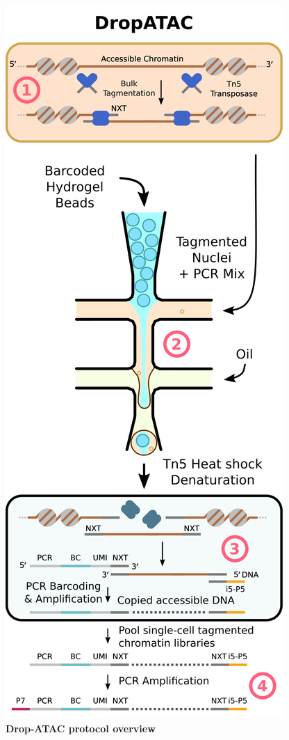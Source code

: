 
\clearpage
\begin{figure}
\centering
\includegraphics[width=\textwidth/2]{./ims/dropatac_compar_combo.png}
\caption[Drop-ATAC Protocol Overview]{\textbf{Drop-ATAC protocol overview}}
\label{fig:dropatac_compar_combo}
\end{figure}

